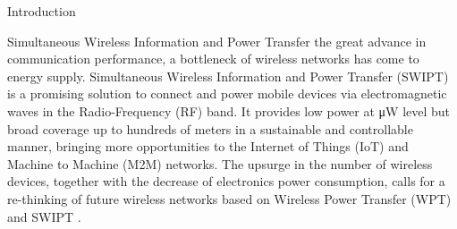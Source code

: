 \documentclass[journal]{IEEEtran}
\begin{document}
	\begin{section}{Introduction}
		\begin{subsection}{Simultaneous Wireless Information and Power Transfer}
			 the great advance in communication performance, a bottleneck of wireless networks has come to energy supply. Simultaneous Wireless Information and Power Transfer (SWIPT) is a promising solution to connect and power mobile devices via electromagnetic waves in the Radio-Frequency (RF) band. It provides low power at \si{\uW} level but broad coverage up to hundreds of meters in a sustainable and controllable manner, bringing more opportunities to the Internet of Things (IoT) and Machine to Machine (M2M) networks. The upsurge in the number of wireless devices, together with the decrease of electronics power consumption, calls for a re-thinking of future wireless networks based on Wireless Power Transfer (WPT) and SWIPT \cite{Clerckx2019}.


\end{subsection}
\end{section}
\end{document}
